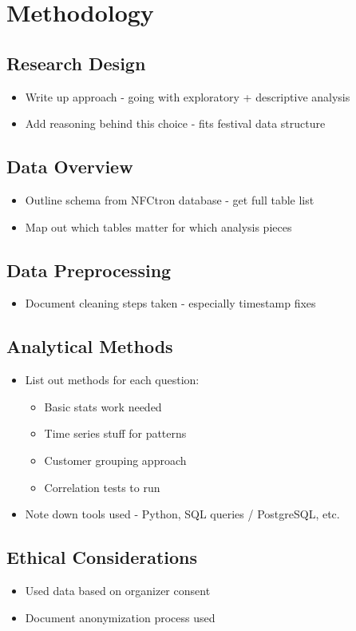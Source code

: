 \chapter{Methodology}
\label{ch:methodology}


\section{Research Design}
\label{sec:methodology-research-design}
\begin{itemize}
    \item Write up approach - going with exploratory + descriptive analysis
    \item Add reasoning behind this choice - fits festival data structure
\end{itemize}


\section{Data Overview}
\label{sec:methodology-data-overview}
\begin{itemize}
    \item Outline schema from NFCtron database - get full table list
    \item Map out which tables matter for which analysis pieces
\end{itemize}


\section{Data Preprocessing}
\label{sec:methodology-data-preprocessing}
\begin{itemize}
    \item Document cleaning steps taken - especially timestamp fixes
\end{itemize}


\section{Analytical Methods}
\label{sec:methodology-analytical-methods}
\begin{itemize}
    \item List out methods for each question:
    \begin{itemize}
        \item Basic stats work needed
        \item Time series stuff for patterns
        \item Customer grouping approach
        \item Correlation tests to run
    \end{itemize}
    \item Note down tools used - Python, SQL queries / PostgreSQL, etc.
\end{itemize}


\section{Ethical Considerations}
\label{sec:methodology-ethical-considerations}
\begin{itemize}
    \item Used data based on organizer consent
    \item Document anonymization process used
\end{itemize}

